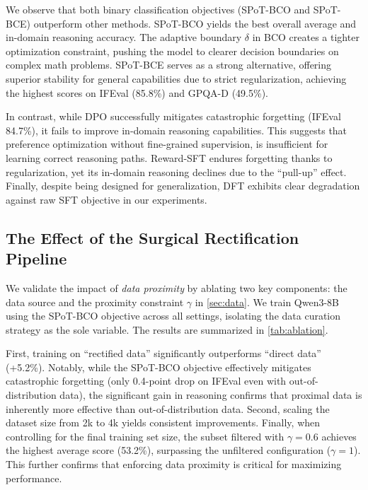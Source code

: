 \documentclass{article}
\theoremstyle{plain}
\theoremstyle{definition}
\theoremstyle{remark}
\begin{document}
We observe that both binary classification objectives (SPoT-BCO and SPoT-BCE) outperform other methods. SPoT-BCO yields the best overall average and in-domain reasoning accuracy. The adaptive boundary $\delta$ in BCO creates a tighter optimization constraint, pushing the model to clearer decision boundaries on complex math problems. SPoT-BCE serves as a strong alternative, offering superior stability for general capabilities due to strict regularization, achieving the highest scores on IFEval (85.8\%) and GPQA-D (49.5\%).

In contrast, while DPO successfully mitigates catastrophic forgetting (IFEval 84.7\%), it fails to improve in-domain reasoning capabilities. This suggests that preference optimization without fine-grained supervision, is insufficient for learning correct reasoning paths. Reward-SFT endures forgetting thanks to regularization, yet its in-domain reasoning declines due to the ``pull-up'' effect. Finally, despite being designed for generalization, DFT exhibits clear degradation against raw SFT objective in our experiments.

\subsection{The Effect of the Surgical Rectification Pipeline}
\label{sec:exper_data}
We validate the impact of \textit{data proximity} by ablating two key components: the data source and the proximity constraint $\gamma$ in \cref{sec:data}. We train Qwen3-8B using the SPoT-BCO objective across all settings, isolating the data curation strategy as the sole variable. The results are summarized in \cref{tab:ablation}.

First, training on ``rectified data'' significantly outperforms ``direct data'' (+5.2\%). Notably, while the SPoT-BCO objective effectively mitigates catastrophic forgetting (only 0.4-point drop on IFEval even with out-of-distribution data), the significant gain in reasoning confirms that proximal data is inherently more effective than out-of-distribution data. Second, scaling the dataset size from 2k to 4k yields consistent improvements. Finally, when controlling for the final training set size, the subset filtered with $\gamma=0.6$ achieves the highest average score (53.2\%), surpassing the unfiltered configuration ($\gamma=1$). This further confirms that enforcing data proximity is critical for maximizing performance.
\end{document}

